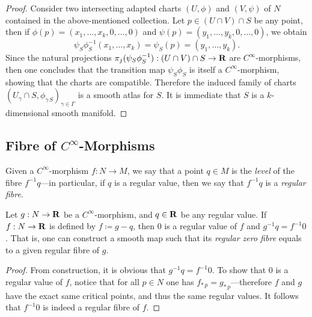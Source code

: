 \begin{proof}
    Consider two intersecting adapted charts \((U, \phi)\) and \((V, \psi)\) of
    \(N\) contained in the above-mentioned collection. Let \(p \in (U \cap V) \cap
    S\) be any point, then if \(\phi(p) = (x_1, \dots, x_k, 0, \dots, 0)\) and
    \(\psi(p) = (y_1, \dots, y_k, 0, \dots, 0)\), we obtain
    \[
        \psi_S \phi_S^{-1}(x_1, \dots, x_k) = \psi_S(p) = (y_1, \dots, y_k).
    \]
    Since the natural projections
    \(\pi_j(\psi_S \phi_S^{-1}): (U \cap V) \cap S \to \mathbf{R}\) are
    \(C^{\infty}\)-morphisms, then one concludes that the transition map
    \(\psi_S \phi_S\) is itself a \(C^{\infty}\)-morphism, showing that the charts
    are compatible. Therefore the induced family of charts
    \((U_{\gamma} \cap S, \phi_{\gamma\, S})_{\gamma \in \Gamma}\) is a smooth atlas
    for \(S\). It is immediate that \(S\) is a \(k\)-dimensional smooth manifold.
\end{proof}

\subsection{Fibre of \texorpdfstring{\(C^{\infty}\)}{Smooth}-Morphisms}

\begin{definition}
    \label{def:fibres-and-levels}
    Given a \(C^{\infty}\)-morphism \(f: N \to M\), we say that a point \(q \in M\)
    is the \emph{level} of the fibre \(f^{-1} q\)---in particular, if \(q\) is a
    regular value, then we say that \(f^{-1} q\) is a \emph{regular fibre}.
\end{definition}

\begin{lemma}
    \label{lem:regular-fibre-equal-zero-regular-fibre}
    Let \(g: N \to \mathbf{R}\) be a \(C^{\infty}\)-morphism, and \(q \in \mathbf{R}\) be any
    regular value. If \(f: N \to \mathbf{R}\) is defined by \(f \coloneq g - q\), then
    \(0\) is a regular value of \(f\) and \(g^{-1} q = f^{-1} 0\). That is, one
    can construct a smooth map such that its \emph{regular zero fibre} equals to a
    given regular fibre of \(g\).
\end{lemma}

\begin{proof}
    From construction, it is obvious that \(g^{-1} q = f^{-1} 0\). To show that
    \(0\) is a regular value of \(f\), notice that for all \(p \in N\) one has
    \(f_{*\, p} = g_{*\, p}\)---therefore \(f\) and \(g\) have the exact same
    critical points, and thus the same regular values. It follows that \(f^{-1} 0\)
    is indeed a regular fibre of \(f\).
\end{proof}

